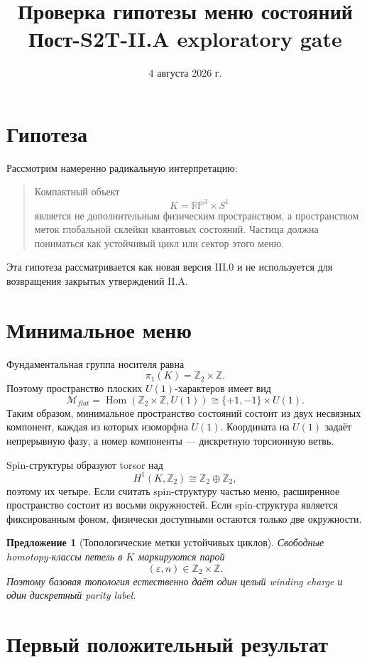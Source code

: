\documentclass[12pt,a4paper]{article}
\title{Проверка гипотезы меню состояний\\
Пост-S2T-II.A exploratory gate}
\author{}
\date{4 августа 2026 г.}
\newtheorem{proposition}{Предложение}
\begin{document}
\maketitle

\section{Гипотеза}

Рассмотрим намеренно радикальную интерпретацию:
\begin{quote}
Компактный объект
\[
K=\mathbb{RP}^3\times S^1
\]
является не дополнительным физическим пространством, а пространством меток глобальной склейки квантовых состояний. Частица должна пониматься как устойчивый цикл или сектор этого меню.
\end{quote}

Эта гипотеза рассматривается как новая версия III.0 и не используется для возвращения закрытых утверждений II.A.

\section{Минимальное меню}

Фундаментальная группа носителя равна
\[
\pi_1(K)=\mathbb Z_2\times\mathbb Z.
\]
Поэтому пространство плоских \(U(1)\)-характеров имеет вид
\[
\mathcal M_{flat}
=\operatorname{Hom}(\mathbb Z_2\times\mathbb Z,U(1))
\cong\{+1,-1\}\times U(1).
\]
Таким образом, минимальное пространство состояний состоит из двух несвязных
компонент, каждая из которых изоморфна \(U(1)\). Координата на \(U(1)\)
задаёт непрерывную фазу, а номер компоненты --- дискретную торсионную ветвь.

Spin-структуры образуют torsor над
\[
H^1(K,\mathbb Z_2)\cong\mathbb Z_2\oplus\mathbb Z_2,
\]
поэтому их четыре. Если считать spin-структуру частью меню, расширенное пространство состоит из восьми окружностей. Если spin-структура является фиксированным фоном, физически доступными остаются только две окружности.

\begin{proposition}[Топологические метки устойчивых циклов]
Свободные homotopy-классы петель в \(K\) маркируются парой
\[
(\varepsilon,n)\in\mathbb Z_2\times\mathbb Z.
\]
Поэтому базовая топология естественно даёт один целый winding charge и один дискретный parity label.
\end{proposition}

\section{Первый положительный результат}
\end{document}
